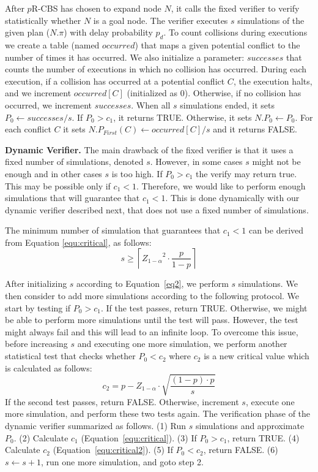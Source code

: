 \documentclass{article}
\newcommand{\prcbs}{$p$R-CBS\xspace}
\begin{document}
After \prcbs{} has chosen to expand node $N$, it calls the fixed verifier to verify statistically whether $N$ is a goal node. The verifier executes $s$ simulations of the given plan ($N.\pi$) with delay probability $p_d$. To count collisions during executions we create a table (named $\mathit{occurred}$) that maps a given potential conflict to the number of times it has occurred. We also initialize a parameter: $\mathit{successes}$ that counts the number of executions in which no collision has occurred. During each execution, if a collision has occurred at a potential conflict $C$, the execution halts, and we increment $\mathit{occurred[C]}$ (initialized as $0$). Otherwise, if no collision has occurred, we increment $\mathit{successes}$. When all $s$ simulations ended, it sets $P_0 \gets \mathit{successes}/s$. If $P_0 > c_1$, it returns TRUE. Otherwise, it sets $N.P_0 \gets P_0$. For each conflict $C$ it sets $N.P_{First}(C) \gets \mathit{occurred[C]}/{s}$ and it returns FALSE.

{\bf Dynamic Verifier.} The main drawback of the fixed verifier is that it uses a fixed number of simulations, denoted $s$. However, in some cases $s$ might not be enough and in other cases $s$ is too high. If $P_0 > c_1$ the verify may return true. This may be possible only if $c_1 < 1$. Therefore, we would like to perform enough simulations that will guarantee that $c_1<1$. This is done dynamically with our dynamic verifier described next, that does not use a fixed number of simulations.  

The minimum number of simulation that guarantees that $c_1<1$ can be derived from Equation \ref{equ:critical}, as follows:
\begin{equation}\label{eq2}
    { s \geq \left \lceil {Z_{1-\alpha}}^2 \cdot \frac{p}{1-p} \right \rceil}
\end{equation}



After initializing $s$ according to Equation~\ref{eq2}, we perform $s$ simulations. We then consider to add more simulations according to the following protocol. We start by testing if $P_0>c_1$. If the test passes, return TRUE. Otherwise, we might be able to perform more simulations until the test will pass. However, the test might always fail and this will lead to an infinite loop.  To overcome this issue, before increasing $s$ and executing one more simulation, we perform another statistical test that checks whether $P_0<c_2$ where $c_2$ is a new critical value which is calculated as follows:
\begin{equation}
c_2=p-Z_{1-\alpha} \cdot \sqrt{\frac{(1-p) \cdot p}{s}}
\label{equ:critical2}
\end{equation}
If the second test passes, return FALSE. Otherwise, increment $s$, execute one more simulation, and perform these two tests again. The verification phase of the dynamic verifier summarized as follows. (1) Run $s$ simulations and approximate $P_0$. (2) Calculate $c_1$  (Equation~\ref{equ:critical}). (3) If $P_0>c_1$, return TRUE. (4) Calculate $c_2$ (Equation~\ref{equ:critical2}). (5) If $P_0<c_2$, return FALSE. (6) $s \gets s+1$, run one more simulation, and goto step 2.
\end{document}
